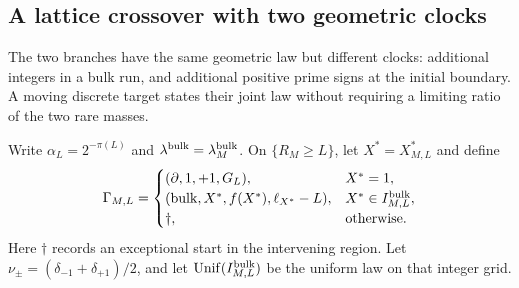 \subsection{A lattice crossover with two geometric clocks}\label{sec:two-clock}
The two branches have the same geometric law but different clocks:
additional integers in a bulk run, and additional positive prime signs at
the initial boundary. A moving discrete target states their joint law
without requiring a limiting ratio of the two rare masses.

Write $\alpha_L=2^{-\pi(L)}$ and $\lambda^{\rm bulk}=\lambda_M^{\rm bulk}$.
On $\{R_M\ge L\}$, let $X^*=X^*_{M,L}$ and define
\[
 \Gamma_{M,L}=
 \begin{cases}
  (\partial,1,+1,G_L),&X^*=1,\\
  (\mathrm{bulk},X^*,f(X^*),\ell_{X^*}-L),&X^*\in I^{\rm bulk}_{M,L},\\
  \dagger,&\text{otherwise}.
 \end{cases}
\]
Here $\dagger$ records an exceptional start in the intervening region.
Let $\nu_\pm=(\delta_{-1}+\delta_{+1})/2$, and let
$\operatorname{Unif}(I^{\rm bulk}_{M,L})$ be the uniform law on that
integer grid.

